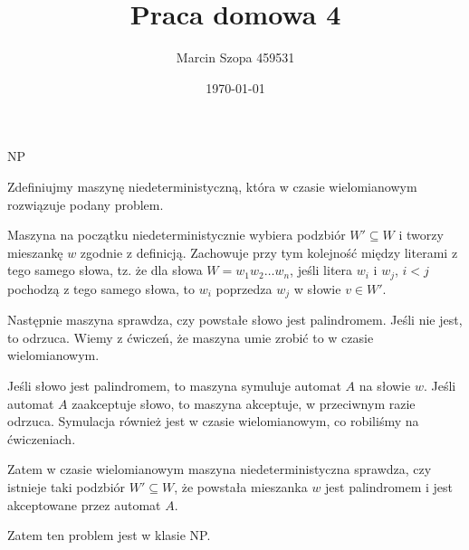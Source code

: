 \documentclass{article}
\title{Praca domowa 4}
\author{Marcin Szopa 459531}
\date{\today}
\theoremstyle{definition}
\theoremstyle{remark}
\begin{document}
\maketitle

\begin{section}{NP}

 Zdefiniujmy maszynę niedeterministyczną, która w czasie wielomianowym
 rozwiązuje podany problem.

 Maszyna na początku niedeterministycznie wybiera podzbiór $W' \subseteq W$ i
 tworzy mieszankę $w$ zgodnie z definicją. Zachowuje przy tym kolejność między
 literami z tego samego słowa, tz. że dla słowa $W = w_1 w_2 \ldots w_n$, jeśli
 litera $w_i$ i $w_j$, $ i < j$ pochodzą z tego samego słowa, to $w_i$ poprzedza
 $w_j$ w słowie $v \in W'$.

 Następnie maszyna sprawdza, czy powstałe słowo jest palindromem. Jeśli nie
 jest, to odrzuca. Wiemy z ćwiczeń, że maszyna umie zrobić to w czasie
 wielomianowym.

 Jeśli słowo jest palindromem, to maszyna symuluje automat $A$ na słowie $w$.
 Jeśli automat $A$ zaakceptuje słowo, to maszyna akceptuje, w przeciwnym razie
 odrzuca. Symulacja również jest w czasie wielomianowym, co robiliśmy na
 ćwiczeniach.

 Zatem w czasie wielomianowym maszyna niedeterministyczna sprawdza, czy istnieje
 taki podzbiór $W' \subseteq W$, że powstała mieszanka $w$ jest palindromem i
 jest akceptowane przez automat $A$.

 Zatem ten problem jest w klasie NP.

\end{section}
\end{document}
